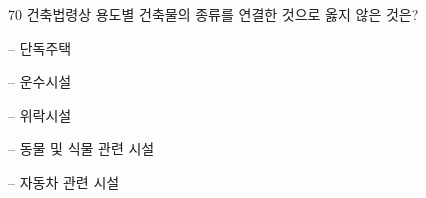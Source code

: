 \begin{question}{70}
건축법령상 용도별 건축물의 종류를 연결한 것으로 옳지 않은 것은?
\par\noindent\hspace{2em}\uline{}\quad\uline{}\par
\begin{choices}
  \item {}\quad -- 단독주택
  \item {}\quad -- 운수시설
  \item {}\quad -- 위락시설
  \item {}\quad -- 동물 및 식물 관련 시설
  \item {}\quad -- 자동차 관련 시설
\end{choices}
\end{question}
